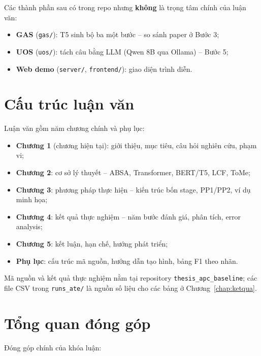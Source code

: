 Các thành phần sau có trong repo nhưng \textbf{không} là trọng tâm chính của luận văn:

\begin{itemize}
  \item \textbf{GAS} (\texttt{gas/}): T5 sinh bộ ba một bước -- so sánh paper ở Bước 3;
  \item \textbf{UOS} (\texttt{uos/}): tách câu bằng LLM (Qwen 8B qua Ollama) -- Bước 5;
  \item \textbf{Web demo} (\texttt{server/}, \texttt{frontend/}): giao diện trình diễn.
\end{itemize}

\section{Cấu trúc luận văn}
\label{sec:gt_cautruc}

Luận văn gồm năm chương chính và phụ lục:

\begin{itemize}
  \item \textbf{Chương 1} (chương hiện tại): giới thiệu, mục tiêu, câu hỏi nghiên cứu, phạm vi;
  \item \textbf{Chương 2}: cơ sở lý thuyết -- ABSA, Transformer, BERT/T5, LCF, ToMe;
  \item \textbf{Chương 3}: phương pháp thực hiện -- kiến trúc bốn stage, PP1/PP2, ví dụ minh họa;
  \item \textbf{Chương 4}: kết quả thực nghiệm -- năm bước đánh giá, phân tích, error analysis;
  \item \textbf{Chương 5}: kết luận, hạn chế, hướng phát triển;
  \item \textbf{Phụ lục}: cấu trúc mã nguồn, hướng dẫn tạo hình, bảng F1 theo nhãn.
\end{itemize}

Mã nguồn và kết quả thực nghiệm nằm tại repository \texttt{thesis\_apc\_baseline}; các
file CSV trong \texttt{runs\_ate/} là nguồn số liệu cho các bảng ở Chương~\ref{chap:ketqua}.

\section{Tổng quan đóng góp}
\label{sec:gt_donggop}

Đóng góp chính của khóa luận:

